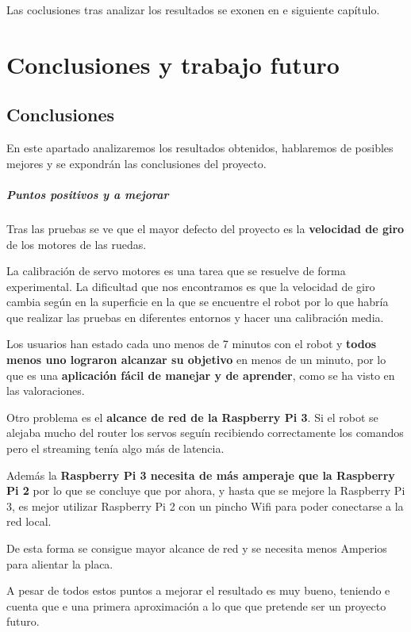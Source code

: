 \documentclass[twoside, 12pt]{epstfg}
\begin{document}
Las coclusiones tras analizar los resultados se exonen en e siguiente capítulo.

\chapter{Conclusiones y trabajo futuro}
\label{chap:conclusiones}
\vspace{-0.2cm}

\section{Conclusiones}
En este apartado analizaremos los resultados obtenidos, hablaremos de posibles mejores y se expondrán las conclusiones del proyecto.

\paragraph{Puntos positivos y a mejorar}

Tras las pruebas se ve que el mayor defecto del proyecto es la \textbf{velocidad de giro} de los motores de las ruedas.

La calibración de servo motores es una tarea que se resuelve de forma experimental. La dificultad que nos encontramos es que la velocidad de giro cambia según en la superficie en la que se encuentre el robot por lo que habría que realizar las pruebas en diferentes entornos y hacer una calibración media.

Los usuarios han estado cada uno menos de 7 minutos con el robot y \textbf{todos menos uno lograron alcanzar su objetivo} en menos de un minuto, por lo que es una \textbf{aplicación fácil de manejar y de aprender}, como se ha visto en las valoraciones.

Otro problema es el \textbf{alcance de red de la Raspberry Pi 3}. Si el robot se alejaba mucho del router los servos seguín recibiendo correctamente los comandos pero el streaming tenía algo más de latencia.

Además la \textbf{Raspberry Pi 3 necesita de más amperaje que la Raspberry Pi 2} por lo que se concluye que por ahora, y hasta que se mejore la Raspberry Pi 3, es mejor utilizar Raspberry Pi 2 con un pincho Wifi para poder conectarse a la red local.

De esta forma se consigue mayor alcance de red y se necesita menos Amperios para alientar la placa.

A pesar de todos estos puntos a mejorar el resultado es muy bueno, teniendo e cuenta que e una primera aproximación a lo que que pretende ser un proyecto futuro.
\end{document}
